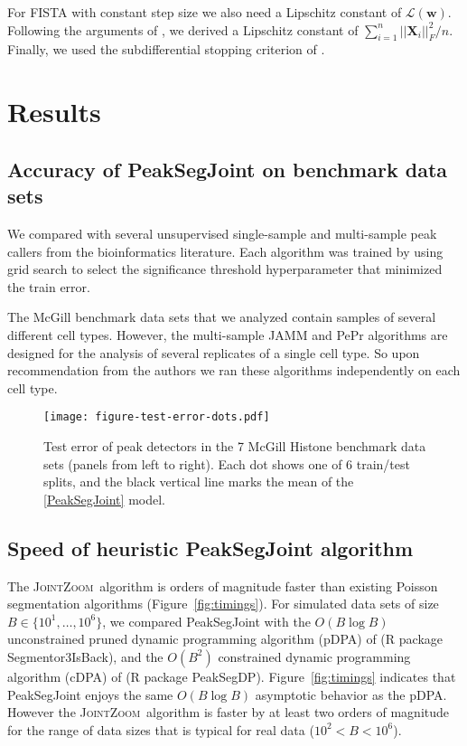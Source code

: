 \documentclass{article} %
\newcommand{\JointHeuristic}{\textsc{JointZoom}}
\begin{document}
For FISTA with constant step size we also need a Lipschitz constant of
$\mathcal L(\mathbf w)$. Following the arguments of
\citet{hingeSquareFISTA}, we derived a Lipschitz constant of
$\sum_{i=1}^n ||\mathbf X_i||_F^2/n$. Finally, we used the
subdifferential stopping criterion of \citet{HOCKING-penalties}.


\section{Results}

\subsection{Accuracy of PeakSegJoint on benchmark data sets}

We compared with several unsupervised single-sample and multi-sample
peak callers from the bioinformatics literature. Each algorithm was
trained by using grid search to select the significance threshold
hyperparameter that minimized the train error.

The McGill benchmark data sets that we analyzed contain samples of
several different cell types. However, the multi-sample JAMM and PePr
algorithms are designed for the analysis of several replicates of a
single cell type. So upon recommendation from the authors we ran these
algorithms independently on each cell type.

\begin{figure}[b!]
  \centering
  \texttt{[image: figure-test-error-dots.pdf]}
  \caption{Test error of peak detectors in the 7 McGill Histone
    benchmark data sets (panels from left to right). Each dot shows
    one of 6 train/test splits, and the black vertical line marks the
    mean of the \ref{PeakSegJoint} model.}
  \label{fig:test-error-dots}
\end{figure}

\subsection{Speed of heuristic PeakSegJoint algorithm}

The \JointHeuristic\ algorithm is orders of magnitude faster than
existing Poisson segmentation algorithms
(Figure~\ref{fig:timings}). For simulated data sets of size
$B\in\{10^1, \dots, 10^6\}$, we compared PeakSegJoint with the
$O(B\log B)$ unconstrained pruned dynamic programming algorithm (pDPA)
of \citet{Segmentor} (R package Segmentor3IsBack), and the $O(B^2)$
constrained dynamic programming algorithm (cDPA) of
\citet{HOCKING-PeakSeg} (R package
PeakSegDP). Figure~\ref{fig:timings} indicates that PeakSegJoint
enjoys the same $O(B \log B)$ asymptotic behavior as the pDPA. However
the \JointHeuristic\ algorithm is faster by at least two orders of
magnitude for the range of data sizes that is typical for real data
($10^2 < B < 10^6$).
\end{document}
